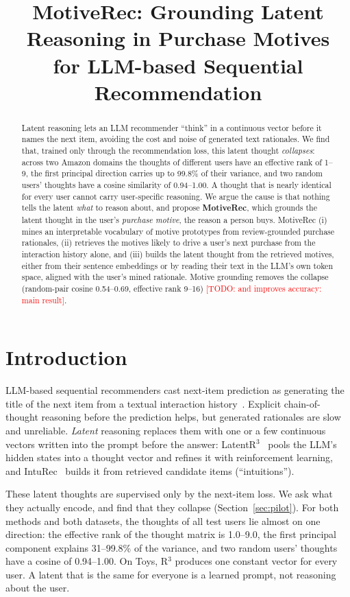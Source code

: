 \documentclass[10pt,twocolumn]{article}
\title{MotiveRec: Grounding Latent Reasoning in Purchase Motives\\for LLM-based Sequential Recommendation}
\author{\todo{authors}}
\date{}
\newcommand{\todo}[1]{\textcolor{red}{[TODO: #1]}}
\begin{document}
\maketitle

\begin{abstract}
Latent reasoning lets an LLM recommender ``think'' in a continuous vector before it names the next item,
avoiding the cost and noise of generated text rationales. We find that, trained only through the
recommendation loss, this latent thought \emph{collapses}: across two Amazon domains the thoughts of
different users have an effective rank of 1--9, the first principal direction carries up to 99.8\% of
their variance, and two random users' thoughts have a cosine similarity of 0.94--1.00. A thought that is
nearly identical for every user cannot carry user-specific reasoning. We argue the cause is that nothing
tells the latent \emph{what} to reason about, and propose \textbf{MotiveRec}, which grounds the latent
thought in the user's \emph{purchase motive}, the reason a person buys. MotiveRec (i) mines an
interpretable vocabulary of motive prototypes from review-grounded purchase rationales, (ii) retrieves
the motives likely to drive a user's next purchase from the interaction history alone, and (iii) builds
the latent thought from the retrieved motives, either from their sentence embeddings or by reading their
text in the LLM's own token space, aligned with the user's mined rationale. Motive grounding removes the
collapse (random-pair cosine 0.54--0.69, effective rank 9--16) \todo{and improves accuracy: main result}.
\end{abstract}

\section{Introduction}
LLM-based sequential recommenders cast next-item prediction as generating the title of the next item
from a textual interaction history~\citep{bigrec,tallrec}. Explicit chain-of-thought reasoning before
the prediction helps, but generated rationales are slow and unreliable. \emph{Latent} reasoning replaces
them with one or a few continuous vectors written into the prompt before the answer: LatentR$^3$~\citep{r3}
pools the LLM's hidden states into a thought vector and refines it with reinforcement learning, and
IntuRec~\citep{inturec} builds it from retrieved candidate items (``intuitions'').

These latent thoughts are supervised only by the next-item loss. We ask what they actually encode, and
find that they collapse (Section~\ref{sec:pilot}). For both methods and both datasets, the thoughts of
all test users lie almost on one direction: the effective rank of the thought matrix is 1.0--9.0, the
first principal component explains 31--99.8\% of the variance, and two random users' thoughts have a
cosine of 0.94--1.00. On Toys, R$^3$ produces one constant vector for every user. A latent that is the
same for everyone is a learned prompt, not reasoning about the user.
\end{document}
